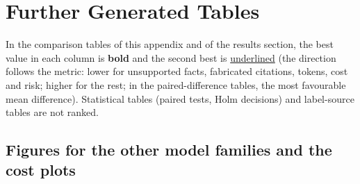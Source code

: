 \section{Further Generated Tables}
\label{app:tables}

\noindent In the comparison tables of this appendix and of the results section, the best value in each column is \textbf{bold} and the second best is \underline{underlined} (the direction follows the metric: lower for unsupported facts, fabricated citations, tokens, cost and risk; higher for the rest; in the paired-difference tables, the most favourable mean difference). Statistical tables (paired tests, Holm decisions) and label-source tables are not ranked.


\FloatBarrier
\subsection*{Figures for the other model families and the cost plots}
\FloatBarrier
{}

